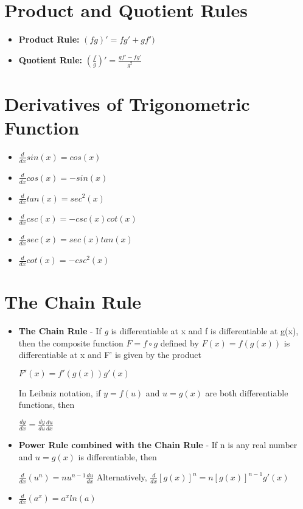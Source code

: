 \documentclass{report}
\newcommand{\ddx}{$\frac{d}{dx}$}
\begin{document}
		\section{Product and Quotient Rules}
			\begin{itemize}\addtolength{\leftskip}{2em}
				\item \textbf{Product Rule: }$(fg)'=fg' + gf')$
				\item \textbf{Quotient Rule: }$(\frac{f}{g})'=\frac{gf'-fg'}{g^2}$
			\end{itemize}
		\section{Derivatives of Trigonometric Function}
			\begin{itemize}\addtolength{\leftskip}{2em}
				\item \ddx$sin(x)=cos(x)$
				\item \ddx$cos(x)=-sin(x)$
				\item \ddx$tan(x)=sec^2(x)$
				\item \ddx$csc(x)=-csc(x)cot(x)$
				\item \ddx$sec(x)=sec(x)tan(x)$
				\item \ddx$cot(x)=-csc^2(x)$
			\end{itemize}
		\section{The Chain Rule}
			\begin{itemize}\addtolength{\leftskip}{2em}
				\item \textbf{The Chain Rule} - If \textit{g} is differentiable at x and f is differentiable at g(x), then the composite function $F=f\circ g$ defined by $F(x)=f(g(x))$ is differentiable at x and F' is given by the product
				\begin{center}
				$F'(x)=f'(g(x))g'(x)$ 
				\end{center} 
				In Leibniz notation, if $y=f(u)$ and $u=g(x)$ are both differentiable functions, then
				\begin{center}
				$\frac{dy}{dx}=\frac{dy}{du}\frac{du}{dx}$
				\end{center}
				\item \textbf{Power Rule combined with the Chain Rule} - If n is any real number and $u=g(x)$ is differentiable, then
				\begin{center}
				\ddx$(u^n)=nu^{n-1}\frac{du}{dx}$
				Alternatively, {\ddx}$[g(x)]^n=n[g(x)]^{n-1}g'(x)$
				\end{center}
				\item \ddx$(a^x)=a^xln(a)$
			\end{itemize}
\end{document}
